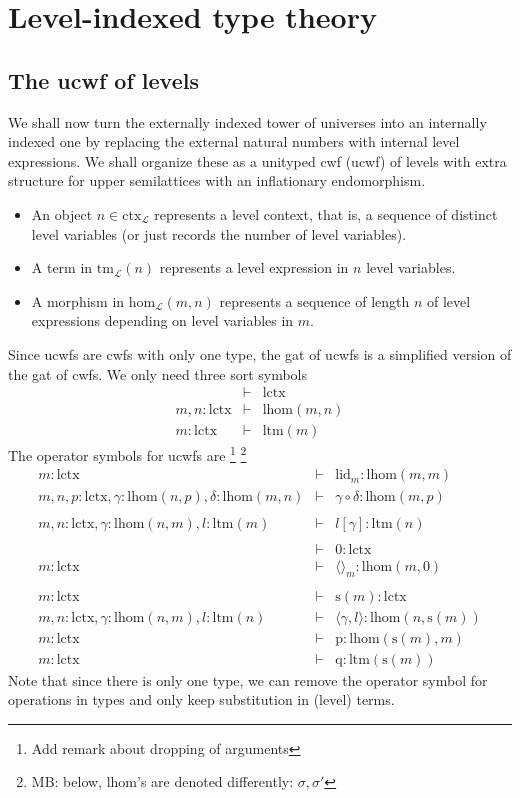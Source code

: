 \documentclass[11pt,a4paper]{article}
\theoremstyle{definition}
\newcommand{\Ctx}{\mathrm{Ctx}}
\newcommand{\Tm}{\mathrm{Tm}}
\def\lhom{\mathrm{lhom}}
\def\Ctx{\mathrm{ctx}}
\def\Tm{\mathrm{tm}}
\def\Hom{\mathrm{hom}}
\def\lHom{\mathrm{lhom}}
\def\lctx{\mathrm{lctx}}
\def\lty{\mathrm{level}}
\def\ltm{\mathrm{ltm}}
\def\s{\mathrm{s}}
\def\lid{\mathrm{lid}}
\newcommand{\tuple}[1]{\langle #1 \rangle}
\def\p{\mathrm{p}}
\def\q{\mathrm{q}}
\def\L{{\mathcal{L}}}
\begin{document}
\section{Level-indexed type theory}

\subsection{The ucwf of levels}
We shall now turn the externally indexed tower of universes into an internally indexed one by replacing the external natural numbers with internal level expressions. We shall organize these as a unityped cwf (ucwf) of levels  with extra structure for upper semilattices with an inflationary endomorphism. 
\begin{itemize}
\item 
An object $n \in \Ctx_\L$ represents a level context, that is, a sequence of distinct level variables (or just records the number of level variables). 
\item
A term in $\Tm_\L(n)$ represents a level expression in $n$ level variables.
\item
A morphism in $\Hom_\L(m,n)$ represents a sequence of length $n$ of level expressions depending on level variables in $m$.
\end{itemize}

Since ucwfs are cwfs with only one type, the gat of ucwfs is a simplified version of the gat of cwfs. We only need three sort symbols 
\begin{eqnarray*}
&\vdash& \lctx\\
m, n : \lctx &\vdash& \lHom(m,n)\\
m : \lctx &\vdash& \ltm(m)
\end{eqnarray*}
The operator symbols for ucwfs are \footnote{Add remark about dropping of arguments}
\footnote{MB: below, lhom's are denoted differently: $\sigma,\sigma'$}
\begin{eqnarray*}
m : \lctx &\vdash& \lid_m : \lhom(m,m)\\
m, n, p : \lctx, \gamma : \lhom(n,p), \delta : \lhom(m,n) &\vdash&
\gamma \circ \delta : \lhom(m,p)\\
&&\\
m,n: \lctx, \gamma : \lhom(n,m), l :\ltm(m) &\vdash&  l[\gamma] : \ltm(n)\\
&&\\
&\vdash& 0 : \lctx\\
m : \lctx &\vdash& \tuple{}_m : \lhom(m,0)\\
&&\\
m : \lctx &\vdash& \s(m) : \lctx\\
m,n : \lctx, \gamma : \lhom(n,m), l:\ltm(n) &\vdash& \tuple{\gamma,l} : \lhom(n,\s(m))\\
m : \lctx &\vdash& \p: \lhom(\s(m),m)\\
m : \lctx &\vdash& \q: \ltm(\s(m))
\end{eqnarray*}
Note that since there is only one type, we can remove the operator symbol for operations in types and only keep substitution in (level) terms.
\end{document}
